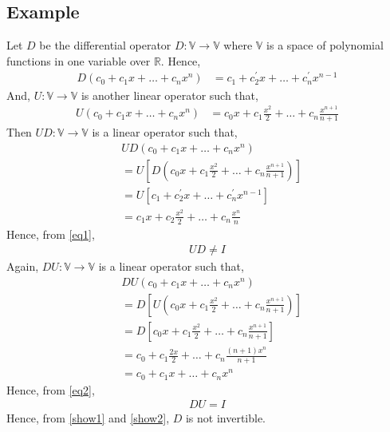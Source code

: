 \documentclass[journal,12pt,twocolumn]{IEEEtran}
\begin{document}
\subsection{Example}
Let $D$ be the differential operator $D:\mathbb{V} \xrightarrow{} \mathbb{V}$ where $\mathbb{V}$ is a space of polynomial functions in one variable over $\mathbb{R}$. Hence,
\begin{align}
D(c_0+c_1x+\dots+c_nx^n) &= c_1+c^{\prime}_2x+\dots+c^{\prime}_nx^{n-1}
\end{align}
And, $U:\mathbb{V} \xrightarrow{} \mathbb{V}$ is another linear operator such that,
\begin{align}
U(c_0+c_1x+\dots+c_nx^n) &= c_0x+c_1\frac{x^2}{2}+\dots+c_n\frac{x^{n+1}}{n+1}
\end{align}
Then $UD:\mathbb{V} \xrightarrow{} \mathbb{V}$ is a linear operator such that,
\begin{align}
&UD(c_0+c_1x+\dots+c_nx^n) \\
&= U[D(c_0x+c_1\frac{x^2}{2}+\dots+c_n\frac{x^{n+1}}{n+1})]\\
&= U[c_1+c^{\prime}_2x+\dots+c^{\prime}_nx^{n-1}]\\
&= c_1x+c_2\frac{x^2}{2}+\dots+c_n\frac{x^{n}}{n}\label{eq1}\
\end{align}
Hence, from \eqref{eq1},
\begin{align}
UD \ne I\label{show1}
\end{align}
Again, $DU:\mathbb{V} \xrightarrow{} \mathbb{V}$ is a linear operator such that,
\begin{align}
&DU(c_0+c_1x+\dots+c_nx^n) \\
&= D[U(c_0x+c_1\frac{x^2}{2}+\dots+c_n\frac{x^{n+1}}{n+1})]\\
&= D[c_0x+c_1\frac{x^2}{2}+\dots+c_n\frac{x^{n+1}}{n+1}]\\
&= c_0+c_1\frac{2x}{2}+\dots+c_n\frac{(n+1)x^{n}}{n+1}\\
&= c_0+c_1x+\dots+c_nx^n\label{eq2}
\end{align}
Hence, from \eqref{eq2},
\begin{align}
DU = I\label{show2}
\end{align}
Hence, from \eqref{show1} and \eqref{show2}, $D$ is not invertible.
\end{document}
